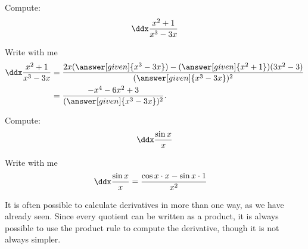 \documentclass{ximera}
\begin{document}
\begin{example}
Compute:
\[
\ddx \frac{x^2+1}{x^3-3x}
\]

\begin{explanation}
Write with me
\begin{align*}
\ddx \frac{x^2+1}{x^3-3x} &= \frac{2x(\answer[given]{x^3-3x})-(\answer[given]{x^2+1})(3x^2-3)}{(\answer[given]{x^3-3x})^2}\\
&=\frac{-x^4-6x^2+3}{(\answer[given]{x^3-3x})^2}.
\end{align*}
\end{explanation}
\end{example}
\begin{example}
Compute:
\[
\ddx \frac{\sin{x}}{x}
\]

\begin{explanation}
Write with me
\begin{align*}
\ddx \frac{\sin{x}}{x} &=  \frac{\cos{x}\cdot x-\sin{x}\cdot1}{x^2}
\end{align*}
\end{explanation}
\end{example}
It is often possible to calculate derivatives in more than one way, as
we have already seen. Since every quotient can be written as a
product, it is always possible to use the product rule to compute the
derivative, though it is not always simpler.
\end{document}
